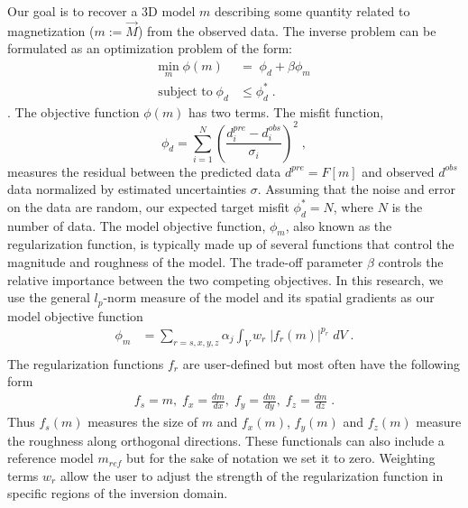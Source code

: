 \documentclass[paper]{geophysics}
\begin{document}
Our goal is to recover a 3D model $m$ describing some quantity related to magnetization ($m:=\vec{M}$) from the observed data.
The inverse problem can be formulated as an optimization problem of the form:
\begin{equation}
\begin{split}\label{GenMinProb}
\underset{{m}}{\text{min}}\; \phi({m}) & = \; \phi_d + \beta \phi_m \\
\text{subject to} \; \phi_d & \leq \phi_d^* \; .
\end{split}
\end{equation}
\cite[~p.~7]{TikhonovArsenin77}.
The objective function $\phi({m})$ has two terms.
The misfit function,
\begin{equation}\label{eq:misfit}
\phi_d =\sum_{i=1}^{N}\left(\frac{{d}_i^{pre} - {d}_i^{obs}}{\sigma_i}\right)^2 \;,
\end{equation}
measures the residual between the predicted data ${d}^{pre} = F[m]$ and observed ${d}^{obs}$ data normalized by estimated uncertainties ${\sigma}$. Assuming that the noise and error on the data are random, our expected target misfit $\phi_d^*=N$, where $N$ is the number of data.
The model objective function, $\phi_m$, also known as the regularization function, is typically made up of several functions that control the magnitude and roughness of the model. The trade-off parameter $\beta$ controls the relative importance between the two competing objectives.
In this research, we use the general $l_p$-norm measure of the model and its spatial gradients as our model objective function
\begin{equation}
\begin{split}\label{intReg}
\phi_m &= \sum_{r=s,x,y,z} \alpha_j \int_V w_r \;|f_r (m)|^{p_r} \;dV\;. \\
\end{split}
\end{equation}
The regularization functions $f_r$ are user-defined but most often have the following form
\begin{equation}
\begin{split}\label{fj}
f_s= m,\;f_x= \frac{d m}{dx},\; f_y= \frac{d m}{dy},\;f_z= \frac{d m}{dz}\;.
\end{split}
\end{equation}
Thus $f_s(m)$ measures the size of $m$ and $f_x(m)$, $f_y(m)$ and $f_z(m)$ measure the roughness along orthogonal directions. These functionals can also include a reference model $m_{ref}$ but for the sake of notation we set it to zero.
Weighting terms $w_r$ allow the user to adjust the strength of the regularization function in specific regions of the inversion domain.
\end{document}
